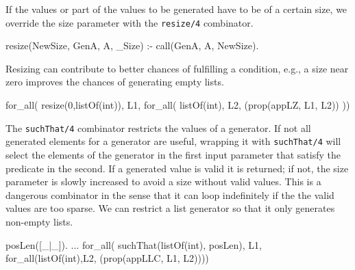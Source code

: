 \documentclass[runningheads,a4paper]{llncs}
\newcommand{\yap}[1]{\lstinline[style=yap]{#1}}
\begin{document}
If the values or part of the values to be generated have to be of a
certain size, we override the size parameter with the \yap{resize/4}
combinator.
%
\begin{yapcode}
 resize(NewSize, GenA, A, _Size) :- call(GenA, A, NewSize).
\end{yapcode}
%
Resizing can contribute to better chances of fulfilling a condition,
e.g., a size near zero improves the chances of generating empty lists.
%
\begin{yapcode}
 for_all(  resize(0,listOf(int)),  L1,
   for_all( listOf(int), L2, (prop({appLZ, L1, L2})) ))
\end{yapcode}


The \yap{suchThat/4} combinator restricts the values of a generator.
%
If not all generated elements for a generator are useful, wrapping it
with \yap{suchThat/4} will select the elements of the generator in the
first input parameter that satisfy the predicate in the second.
%
If a generated value is valid it is returned; if not, the size parameter is
slowly increased to avoid a size without valid values.
%
This is a dangerous combinator in the sense that it can loop
indefinitely  if the the valid values are too sparse.
%
We can restrict a list generator so that it only generates non-empty
lists.
%
\begin{yapcode}
 posLen([_|_]).
 ...
   for_all(  suchThat(listOf(int), posLen),  L1,
     for_all(listOf(int),L2, (prop({appLLC, L1, L2}))))
\end{yapcode}

                                                        
\end{document}
